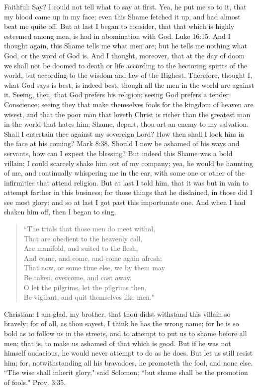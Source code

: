 Faithful: Say? I could not tell what to say at first. Yea, he put me so to it, that my blood came up in my face; even this Shame fetched it up, and had almost beat me quite off. But at last I began to consider, that that which is highly esteemed among men, is had in abomination with God. Luke 16:15. And I thought again, this Shame tells me what men are; but he tells me nothing what God, or the word of God is. And I thought, moreover, that at the day of doom we shall not be doomed to death or life according to the hectoring spirits of the world, but according to the wisdom and law of the Highest. Therefore, thought I, what God says is best, is indeed best, though all the men in the world are against it. Seeing, then, that God prefers his religion; seeing God prefers a tender Conscience; seeing they that make themselves fools for the kingdom of heaven are wisest, and that the poor man that loveth Christ is richer than the greatest man in the world that hates him; Shame, depart, thou art an enemy to my salvation. Shall I entertain thee against my sovereign Lord? How then shall I look him in the face at his coming? Mark 8:38. Should I now be ashamed of his ways and servants, how can I expect the blessing? But indeed this Shame was a bold villain; I could scarcely shake him out of my company; yea, he would be haunting of me, and continually whispering me in the ear, with some one or other of the infirmities that attend religion. But at last I told him, that it was but in vain to attempt farther in this business; for those things that he disdained, in those did I see most glory: and so at last I got past this importunate one. And when I had shaken him off, then I began to sing,
\begin{verse}
``The trials that those men do meet withal,\\
That are obedient to the heavenly call,\\
Are manifold, and suited to the flesh,\\
And come, and come, and come again afresh;\\
That now, or some time else, we by them may\\
Be taken, overcome, and cast away.\\
O let the pilgrims, let the pilgrims then,\\
Be vigilant, and quit themselves like men."\\
\end{verse}
Christian: I am glad, my brother, that thou didst withstand this villain so bravely; for of all, as thou sayest, I think he has the wrong name; for he is so bold as to follow us in the streets, and to attempt to put us to shame before all men; that is, to make us ashamed of that which is good. But if he was not himself audacious, he would never attempt to do as he does. But let us still resist him; for, notwithstanding all his bravadoes, he promoteth the fool, and none else. ``The wise shall inherit glory," said Solomon; ``but shame shall be the promotion of fools." Prov. 3:35.

